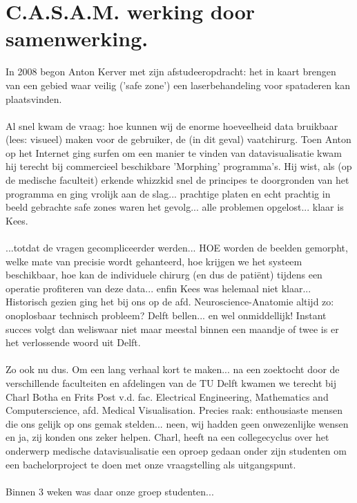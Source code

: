 
\section*{C.A.S.A.M. werking door samenwerking.}
In 2008 begon Anton Kerver met zijn afstudeeropdracht: het in kaart brengen van een gebied waar veilig ('safe zone') een laserbehandeling voor spataderen kan plaatsvinden.
\\
\\
Al snel kwam de vraag: hoe kunnen wij de enorme hoeveelheid data bruikbaar (lees: visueel) maken  voor de gebruiker, de (in dit geval) vaatchirurg. 
Toen Anton op het Internet ging surfen om een manier te vinden van datavisualisatie kwam hij terecht bij commercieel beschikbare 'Morphing' programma's. 
Hij wist, als (op de medische faculteit) erkende whizzkid snel de principes te doorgronden van het programma en ging vrolijk aan de slag... 
prachtige platen en echt prachtig in beeld gebrachte safe zones waren het gevolg... 
alle problemen opgelost... klaar is Kees.
\\
\\
...totdat de vragen gecompliceerder werden... 
HOE worden de beelden gemorpht, welke mate van precisie wordt gehanteerd, hoe krijgen we het systeem beschikbaar, hoe kan de individuele chirurg (en dus de pati\"{e}nt) tijdens een operatie profiteren van deze data... enfin Kees was helemaal niet klaar...
Historisch gezien ging het bij ons op de afd. Neuroscience-Anatomie altijd zo: onoplosbaar technisch probleem? 
Delft bellen... en wel onmiddellijk! 
Instant succes volgt dan weliswaar niet maar meestal binnen een maandje of twee is er het verlossende woord uit Delft.
\\
\\
Zo ook nu dus. 
Om een lang verhaal kort te maken... 
na een zoektocht door de verschillende faculteiten en afdelingen van de TU Delft kwamen we terecht bij Charl Botha en Frits Post v.d. fac. Electrical Engineering, Mathematics and Computerscience,  afd. Medical Visualisation. 
Precies raak: enthousiaste mensen die ons gelijk op ons gemak stelden... 
neen, wij hadden geen onwezenlijke wensen en ja, zij konden ons zeker helpen. 
Charl, heeft na een collegecyclus over het onderwerp medische datavisualisatie een oproep gedaan onder zijn studenten om een bachelorproject te doen met onze vraagstelling als uitgangspunt.
\\
\\
Binnen 3 weken was daar onze groep studenten... 
